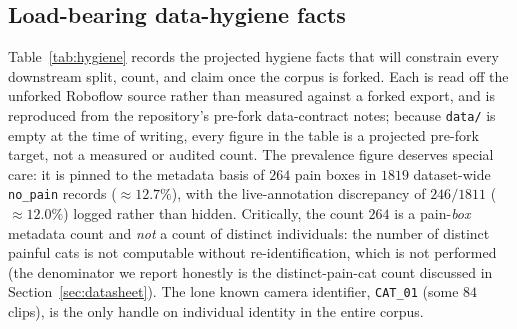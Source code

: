 \subsection{Load-bearing data-hygiene facts}
\label{subsec:hygiene}

Table~\ref{tab:hygiene} records the projected hygiene facts that will constrain
every downstream split, count, and claim once the corpus is forked. Each is read
off the unforked Roboflow source rather than measured against a forked export,
and is reproduced from the repository's pre-fork data-contract notes; because
\texttt{data/} is empty at the time of writing, every figure in the table is a
projected pre-fork target, not a measured or audited count. The prevalence
figure deserves special
care: it is pinned to the metadata basis of $264$ pain boxes in $1819$
dataset-wide \texttt{no\_pain} records ($\approx 12.7\%$), with the
live-annotation discrepancy of $246/1811$ ($\approx 12.0\%$) logged rather than
hidden. Critically, the count $264$ is a pain-\emph{box} metadata count and
\emph{not} a count of distinct individuals: the number of distinct painful cats
is not computable without re-identification, which is not performed (the
denominator we report honestly is the distinct-pain-cat count discussed in
Section~\ref{sec:datasheet}). The lone known camera identifier, \texttt{CAT\_01}
(some $84$ clips), is the only handle on individual identity in the entire
corpus.

